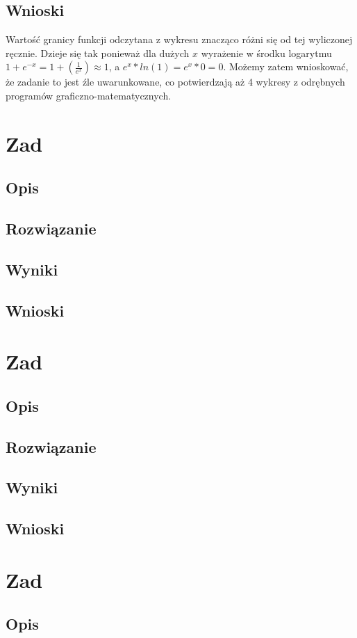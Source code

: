 \documentclass[10pt,a4paper]{article}
\begin{document}
\subsection*{Wnioski}
Wartość granicy funkcji odczytana z wykresu znacząco różni się od tej wyliczonej ręcznie. Dzieje się tak ponieważ dla dużych $x$ wyrażenie w środku logarytmu $1+e^{-x} = 1+( \frac{1}{e^x})  \approx 1$, a $e^x*ln(1) = e^x*0=0$. Możemy zatem wnioskować, że zadanie to jest źle uwarunkowane, co potwierdzają aż 4 wykresy z odrębnych programów graficzno-matematycznych.
\section{Zad}
\subsection*{Opis}
\subsection*{Rozwiązanie}
\subsection*{Wyniki}
\subsection*{Wnioski}
\section{Zad}
\subsection*{Opis}
\subsection*{Rozwiązanie}
\subsection*{Wyniki}
\subsection*{Wnioski}
\section{Zad}
\subsection*{Opis}
\end{document}
